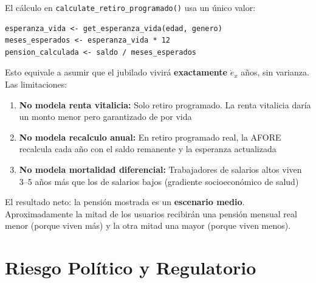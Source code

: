 \documentclass[11pt,a4paper]{report}
\begin{document}
\begin{tcolorbox}[colback=orange!5!white, colframe=orange!75!black, title=\textbf{Aplicaci\'on en C\'odigo: Esperanza Puntual, No Distribucional}]
El c\'alculo en \texttt{calculate\_retiro\_programado()} usa un \'unico valor:

\begin{lstlisting}
esperanza_vida <- get_esperanza_vida(edad, genero)
meses_esperados <- esperanza_vida * 12
pension_calculada <- saldo / meses_esperados
\end{lstlisting}

Esto equivale a asumir que el jubilado vivir\'a \textbf{exactamente} $\mathring{e}_x$ a\~nos, sin varianza. Las limitaciones:

\begin{enumerate}
  \item \textbf{No modela renta vitalicia:} Solo retiro programado. La renta vitalicia dar\'ia un monto menor pero garantizado de por vida
  \item \textbf{No modela recalculo anual:} En retiro programado real, la AFORE recalcula cada a\~no con el saldo remanente y la esperanza actualizada
  \item \textbf{No modela mortalidad diferencial:} Trabajadores de salarios altos viven 3--5 a\~nos m\'as que los de salarios bajos (gradiente socioecon\'omico de salud)
\end{enumerate}

El resultado neto: la pensi\'on mostrada es un \textbf{escenario medio}. Aproximadamente la mitad de los usuarios recibir\'an una pensi\'on mensual real menor (porque viven m\'as) y la otra mitad una mayor (porque viven menos).
\end{tcolorbox}


\section{Riesgo Pol\'itico y Regulatorio}
\end{document}
